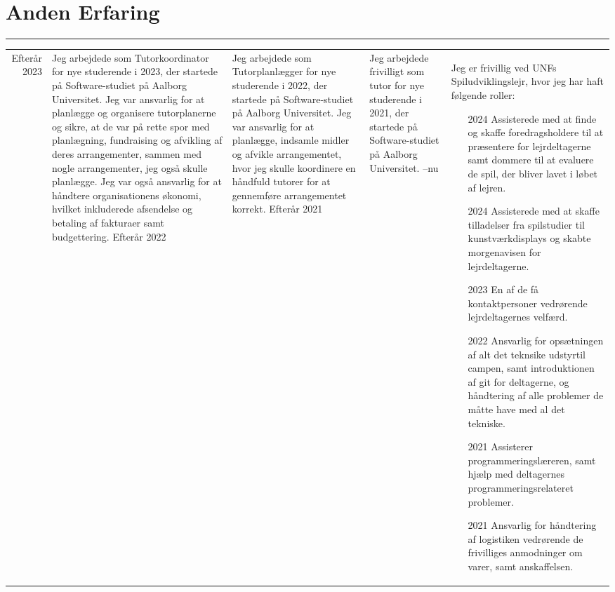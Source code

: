 \documentclass[a4paper]{report}
\def\secsep{\hrule width5cm}
\begin{document}
\section*{Anden Erfaring}
\secsep
\begin{longtabu} to \textwidth {r|X}
Efterår 2023 & 
Jeg arbejdede som Tutorkoordinator for nye studerende i 2023, der startede på Software-studiet på Aalborg Universitet.
Jeg var ansvarlig for at planlægge og organisere tutorplanerne og sikre, at de var på rette spor med planlægning, fundraising og afvikling af deres arrangementer, sammen med nogle arrangementer, jeg også skulle planlægge.
Jeg var også ansvarlig for at håndtere organisationens økonomi, hvilket inkluderede afsendelse og betaling af fakturaer samt budgettering.
\n
Efterår 2022 & 
Jeg arbejdede som Tutorplanlægger for nye studerende i 2022, der startede på Software-studiet på Aalborg Universitet.
Jeg var ansvarlig for at planlægge, indsamle midler og afvikle arrangementet, hvor jeg skulle koordinere en håndfuld tutorer for at gennemføre arrangementet korrekt.
\n
Efterår 2021 & 
Jeg arbejdede frivilligt som tutor for nye studerende i 2021, der startede på Software-studiet på Aalborg Universitet.
--nu & 
Jeg er frivillig ved UNFs Spiludviklingslejr, hvor jeg har haft følgende roller:
\begin{itemize}[leftmargin=4em]
    \item[2024]  Assisterede med at finde og skaffe foredragsholdere til at præsentere for lejrdeltagerne samt dommere til at evaluere de spil, der bliver lavet i løbet af lejren.
    \item[2024]  Assisterede med at skaffe tilladelser fra spilstudier til kunstværkdisplays og skabte morgenavisen for lejrdeltagerne.
    \item[2023]  En af de få kontaktpersoner vedrørende lejrdeltagernes velfærd.
    \item[2022]  Ansvarlig for opsætningen af alt det teknsike
            udstyrtil campen, samt introduktionen af git for deltagerne, og håndtering
            af alle problemer de måtte have med al det tekniske.
    \item[2021]  Assisterer programmeringslæreren, samt
            hjælp med deltagernes programmeringsrelateret problemer.
    \item[2021]  Ansvarlig for håndtering af logistiken
            vedrørende de frivilliges anmodninger om varer, samt anskaffelsen.
\end{itemize}
\end{longtabu}
\end{document}
